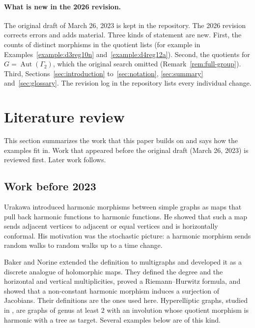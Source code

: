 \documentclass[12pt,letterpaper]{article}
\theoremstyle{definition}
\DeclareMathOperator{\Aut}{Aut}
\begin{document}
\paragraph{What is new in the 2026 revision.}
The original draft of March 26, 2023 is kept in the repository. The 2026
revision corrects errors and adds material. Three kinds of statement are
new. First, the counts of distinct morphisms in the quotient lists (for
example in Examples~\ref{example:d3reg10n} and~\ref{example:d4reg12a}).
Second, the quotients for $G=\Aut(\Gamma_2)$, which the original search
omitted (Remark~\ref{rem:full-group}). Third, Sections~\ref{sec:introduction}
to~\ref{sec:notation}, \ref{sec:summary} and~\ref{sec:glossary}. The revision
log in the repository lists every individual change.

\section{Literature review}
\label{sec:literature}

This section summarizes the work that this paper builds on and says how
the examples fit in. Work that appeared before the original draft (March
26, 2023) is reviewed first. Later work follows.

\subsection{Work before 2023}

Urakawa \cite{Ur00} introduced harmonic morphisms between simple graphs as
maps that pull back harmonic functions to harmonic functions. He showed that
such a map sends adjacent vertices to adjacent or equal vertices and is
horizontally conformal. His motivation was the stochastic picture: a
harmonic morphism sends random walks to random walks up to a time change.

Baker and Norine \cite{BN09} extended the definition to multigraphs and
developed it as a discrete analogue of holomorphic maps. They defined the
degree and the horizontal and vertical multiplicities, proved a
Riemann--Hurwitz formula, and showed that a non-constant harmonic morphism
induces a surjection of Jacobians. Their definitions are the ones used here.
Hyperelliptic graphs, studied in \cite{BN09}, are graphs of genus at least
$2$ with an involution whose quotient morphism is harmonic with a tree as
target. Several examples below are of this kind.
\end{document}
